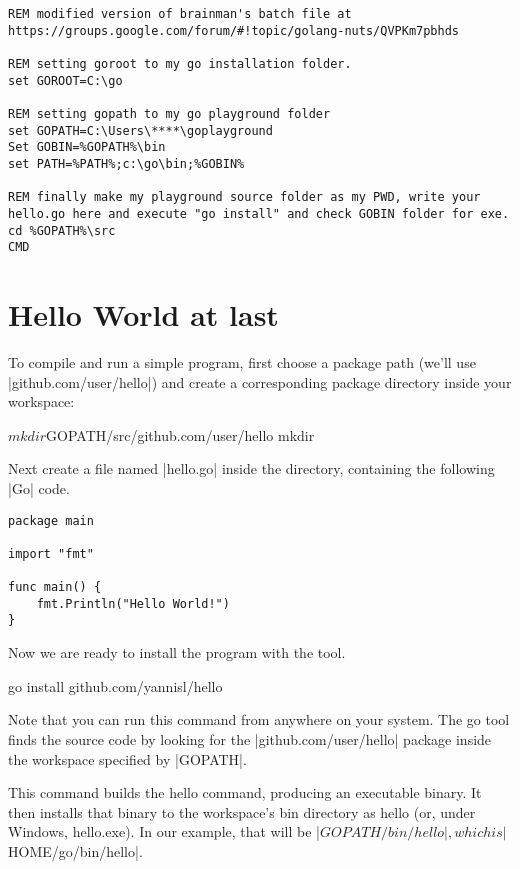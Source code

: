 \begin{lstlisting}
REM modified version of brainman's batch file at https://groups.google.com/forum/#!topic/golang-nuts/QVPKm7pbhds
 
REM setting goroot to my go installation folder.
set GOROOT=C:\go
 
REM setting gopath to my go playground folder
set GOPATH=C:\Users\****\goplayground
Set GOBIN=%GOPATH%\bin
set PATH=%PATH%;c:\go\bin;%GOBIN%
 
REM finally make my playground source folder as my PWD, write your hello.go here and execute "go install" and check GOBIN folder for exe.
cd %GOPATH%\src
CMD
\end{lstlisting}



\section{Hello World at last}

To compile and run a simple program, first choose a package path (we'll use |github.com/user/hello|) and create a corresponding package directory inside your workspace:

\begin{teX}
$ mkdir $GOPATH/src/github.com/user/hello
mkdir %
\end{teX}

Next create a file named |hello.go| inside the directory, containing the
following |Go| code.

\begin{lstlisting}
package main

import "fmt"

func main() {
    fmt.Println("Hello World!")
}
\end{lstlisting}

Now we are ready to install the program with the \Go tool.

\begin{teX}
go install github.com/yannisl/hello
\end{teX}

Note that you can run this command from anywhere on your system. The go tool finds the source code by looking for the |github.com/user/hello| package inside the workspace specified by |GOPATH|.

This command builds the hello command, producing an executable binary. It then installs that binary to the workspace's bin directory as hello (or, under Windows, hello.exe). In our example, that will be |$GOPATH/bin/hello|, which is |$HOME/go/bin/hello|.

